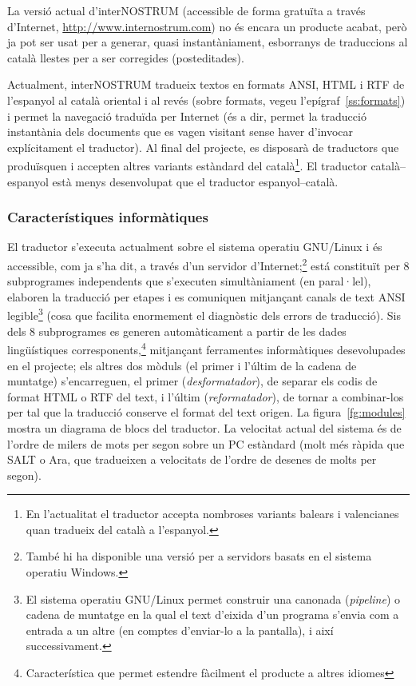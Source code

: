 La versió actual d'{\sf interNOSTRUM} (accessible de forma gratuïta a
través d'Internet, \url{http://www.internostrum.com}) no és
encara un producte acabat, però ja pot ser usat per a generar, quasi
instantàniament, esborranys de traduccions al català llestes per a ser
corregides (posteditades).

Actualment, {\sf interNOSTRUM} tradueix textos en formats ANSI, HTML i
RTF de l'espanyol al català oriental i al revés (sobre formats, vegeu
l'epígraf~\ref{ss:formats}) i permet la navegació traduïda per
Internet (és a dir, permet la traducció instantània dels documents que
es vagen visitant sense haver d'invocar explícitament el traductor).
Al final del projecte, es disposarà de traductors que produïsquen i
accepten altres variants estàndard del català\footnote{En l'actualitat
  el traductor accepta nombroses variants balears i valencianes
  quan tradueix del català a l'espanyol.}. El traductor
català--espanyol està menys desenvolupat que el traductor
espanyol--català.

\subsubsection{Característiques informàtiques}

El traductor s'executa actualment sobre el sistema operatiu GNU/Linux i és
accessible, com ja s'ha dit, a través d'un servidor
d'Internet;\footnote{També hi ha disponible una versió per a servidors
  basats en el sistema operatiu Windows.} está constituït per 8
subprogrames independents que s'executen simultàniament (en
paral·lel), elaboren la traducció per etapes i es comuniquen
mitjançant canals de text ANSI legible\footnote{El sistema operatiu
  GNU/Linux permet construir una canonada (\emph{pipeline}) o cadena de
  muntatge en la qual el text d'eixida d'un programa s'envia com a
  entrada a un altre (en comptes d'enviar-lo a la pantalla), i així
  successivament.} (cosa que facilita enormement el diagnòstic dels
errors de traducció). Sis dels 8 subprogrames es generen
automàticament a partir de les dades lingüístiques
corresponents,\footnote{Característica que permet estendre fàcilment
  el producte a altres idiomes} mitjançant ferramentes informàtiques
desevolupades en el projecte; els altres dos mòduls (el primer i
l'últim de la cadena de muntatge) s'encarreguen, el primer
(\emph{desformatador}), de separar els codis de format HTML o RTF del
text, i l'últim (\emph{reformatador}), de tornar a combinar-los per
tal que la traducció conserve el format del text origen.  La
figura~\ref{fg:modules} mostra un diagrama de blocs del traductor. La
velocitat actual del sistema és de l'ordre de milers de mots per segon
sobre un PC estàndard (molt més ràpida que SALT o Ara, que tradueixen
a velocitats de l'ordre de desenes de molts per segon).

